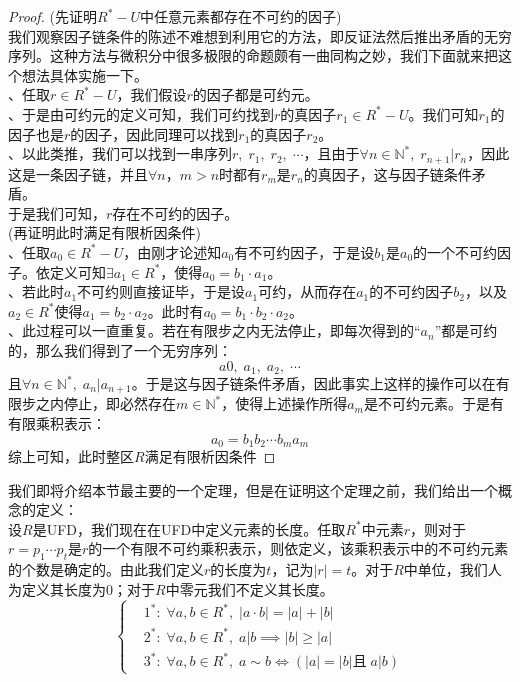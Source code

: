 \begin{proof}
(先证明$R^*-U$中任意元素都存在不可约的因子)\\
\indent 我们观察因子链条件的陈述不难想到利用它的方法，即反证法然后推出矛盾的无穷序列。这种方法与微积分中很多极限的命题颇有一曲同构之妙，我们下面就来把这个想法具体实施一下。\\
、任取$r\in R^*-U$，我们假设$r$的因子都是可约元。\\
、于是由可约元的定义可知，我们可约找到$r$的真因子$r_1\in R^*-U$。我们可知$r_1$的因子也是$r$的因子，因此同理可以找到$r_1$的真因子$r_2$。\\
、以此类推，我们可以找到一串序列$r,\; r_1,\; r_2,\; \cdots$，且由于$\forall n\in \mathbb{N}^*,\; r_{n+1}|r_n$，因此这是一条因子链，并且$\forall n$，$m>n$时都有$r_m$是$r_n$的真因子，这与因子链条件矛盾。\\
\indent 于是我们可知，$r$存在不可约的因子。\\
(再证明此时满足有限析因条件)\\
、任取$a_0\in R^*-U$，由刚才论述知$a_0$有不可约因子，于是设$b_1$是$a_0$的一个不可约因子。依定义可知$\exists a_1\in R^*$，使得$a_0=b_1\cdot a_1$。\\
、若此时$a_1$不可约则直接证毕，于是设$a_1$可约，从而存在$a_1$的不可约因子$b_2$，以及$a_2\in R^*$使得$a_1=b_2\cdot a_2$。此时有$a_0=b_1\cdot b_2\cdot a_2$。\\
、此过程可以一直重复。若在有限步之内无法停止，即每次得到的“$a_n$”都是可约的，那么我们得到了一个无穷序列：
\[
a0,\; a_1,\; a_2,\; \cdots
\]
且$\forall n\in \mathbb{N}^*,\; a_n|a_{n+1}$。于是这与因子链条件矛盾，因此事实上这样的操作可以在有限步之内停止，即必然存在$m\in \mathbb{N}^*$，使得上述操作所得$a_m$是不可约元素。于是有有限乘积表示：
\[
a_0=b_1b_2\cdots b_ma_m
\]
\indent 综上可知，此时整区$R$满足有限析因条件
\end{proof}
\indent 我们即将介绍本节最主要的一个定理，但是在证明这个定理之前，我们给出一个概念的定义：\\
设$R$是UFD，我们现在在UFD中定义元素的长度。任取$R^*$中元素$r$，则对于$r=p_1\cdots p_t$是$r$的一个有限不可约乘积表示，则依定义，该乘积表示中的不可约元素的个数是确定的。由此我们定义$r$的长度为$t$，记为$|r|=t$。对于$R$中单位，我们人为定义其长度为$0$；对于$R$中零元我们不定义其长度。\\
\[
\left\{
\begin{aligned}
&1^*:\;\forall a,b\in R^*,\; |a\cdot b|=|a|+|b|\\
&2^*:\;\forall a,b\in R^*,\; a|b\implies |b|\geq|a|\\
&3^*:\;\forall a,b\in R^*,\; a\sim b\iff (|a|=|b|\text{且}\; a|b)
\end{aligned}\right.
\]
